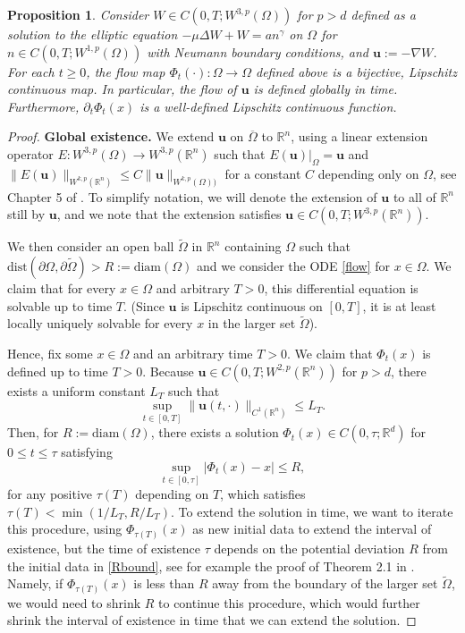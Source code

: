 \documentclass[12pt]{article}
\newcommand{\bd}{\boldsymbol}
\def\R{{\mathbb R}}
\theoremstyle{plain}
\newtheorem{proposition}{Proposition}[section]
\begin{document}
\begin{proposition}\label{flowprop}
Consider $W \in C(0, T; W^{3, p}(\Omega))$ for $p > d$ defined as a solution to the elliptic equation $-\mu \Delta W + W = an^{\gamma}$ on $\Omega$ for $n \in C(0, T; W^{1, p}(\Omega))$ with Neumann boundary conditions, and $\bd{u} := -\nabla W$. For each $t \ge 0$, the flow map $\Phi_{t}( \cdot): \Omega \to \Omega$ defined above is a bijective, Lipschitz continuous map. In particular, the flow of $\bd{u}$ is defined globally in time. Furthermore, $\partial_{t}\Phi_{t}(x)$ is a well-defined Lipschitz continuous function.
\end{proposition}

\begin{proof}
\noindent \textbf{Global existence.} We extend $\bd{u}$ on $\overline{\Omega}$ to $\R^{n}$, using a linear extension operator $E: W^{3, p}(\Omega) \to W^{3, p}(\R^{n})$ such that $E(\bd{u})|_{\Omega} = \bd{u}$ and $\|E(\bd{u})\|_{W^{k, p}(\R^{n})} \le C\|\bd{u}\|_{W^{k, p}(\Omega))}$ for a constant $C$ depending only on $\Omega$, see Chapter 5 of \cite{AdamsFournier}. To simplify notation, we will denote the extension of $\bd{u}$ to all of $\R^{n}$ still by $\bd{u}$, and we note that the extension satisfies $\bd{u} \in C(0, T; W^{3, p}(\R^{n}))$. 

We then consider an open ball $\tilde{\Omega}$ in $\R^{n}$ containing $\Omega$ such that $\text{dist}(\partial \Omega, \partial \tilde{\Omega}) > R := \text{diam}(\Omega)$ and we consider the ODE \eqref{flow} for $x \in \Omega$. We claim that for every $x \in \Omega$ and arbitrary $T > 0$, this differential equation is solvable up to time $T$. (Since $\bd{u}$ is Lipschitz continuous on $[0, T]$, it is at least locally uniquely solvable for every $x$ in the larger set $\tilde{\Omega}$).

Hence, fix some $x \in \Omega$ and an arbitrary time $T > 0$. We claim that $\Phi_{t}(x)$ is defined up to time $T > 0$. Because $\bd{u} \in C(0, T; W^{2, p}(\R^{n}))$ for $p > d$, there exists a uniform constant $L_T$ such that 
\begin{equation}\label{LT}
\sup_{t \in [0, T]} \|\bd{u}(t, \cdot)\|_{C^{1}(\R^{n})} \le L_T.
\end{equation}
Then, for $R := \text{diam}(\Omega)$, there exists a solution $\Phi_{t}(x) \in C(0, \tau; \R^{d})$ for $0 \le t \le \tau$ satisfying
\begin{equation}\label{Rbound}
\sup_{t \in [0, \tau]} |\Phi_{t}(x) - x| \le R,
\end{equation}
for any positive $\tau(T)$ depending on $T$, which satisfies $\tau(T) < \min(1/L_{T}, R/L_{T})$. To extend the solution in time, we want to iterate this procedure, using $\Phi_{\tau(T)}(x)$ as new initial data to extend the interval of existence, but the time of existence $\tau$ depends on the potential deviation $R$ from the initial data in \eqref{Rbound}, see for example the proof of Theorem 2.1 in \cite{TaylorPDE}. Namely, if $\Phi_{\tau(T)}(x)$ is less than $R$ away from the boundary of the larger set $\tilde\Omega$, we would need to shrink $R$ to continue this procedure, which would further shrink the interval of existence in time that we can extend the solution.


\end{proof}
\end{document}
